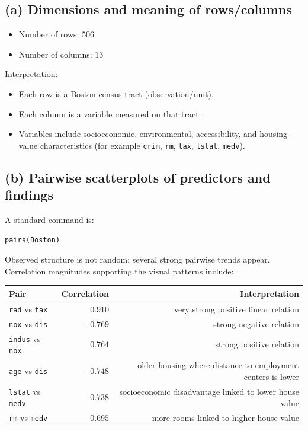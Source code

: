 \documentclass[12pt]{article}
\begin{document}
\subsection*{(a) Dimensions and meaning of rows/columns}
\begin{itemize}
\item Number of rows: $506$
\item Number of columns: $13$
\end{itemize}

Interpretation:
\begin{itemize}
\item Each row is a Boston census tract (observation/unit).
\item Each column is a variable measured on that tract.
\item Variables include socioeconomic, environmental, accessibility, and housing-value characteristics (for example \texttt{crim}, \texttt{rm}, \texttt{tax}, \texttt{lstat}, \texttt{medv}).
\end{itemize}

\subsection*{(b) Pairwise scatterplots of predictors and findings}
A standard command is:
\begin{verbatim}
pairs(Boston)
\end{verbatim}

Observed structure is not random; several strong pairwise trends appear. Correlation magnitudes supporting the visual patterns include:
\begin{center}
\begin{tabular}{lrr}
\toprule
Pair & Correlation & Interpretation \\
\midrule
\texttt{rad} vs \texttt{tax} & $0.910$ & very strong positive linear relation \\
\texttt{nox} vs \texttt{dis} & $-0.769$ & strong negative relation \\
\texttt{indus} vs \texttt{nox} & $0.764$ & strong positive relation \\
\texttt{age} vs \texttt{dis} & $-0.748$ & older housing where distance to employment centers is lower \\
\texttt{lstat} vs \texttt{medv} & $-0.738$ & socioeconomic disadvantage linked to lower house value \\
\texttt{rm} vs \texttt{medv} & $0.695$ & more rooms linked to higher house value \\
\bottomrule
\end{tabular}
\end{center}
\end{document}
